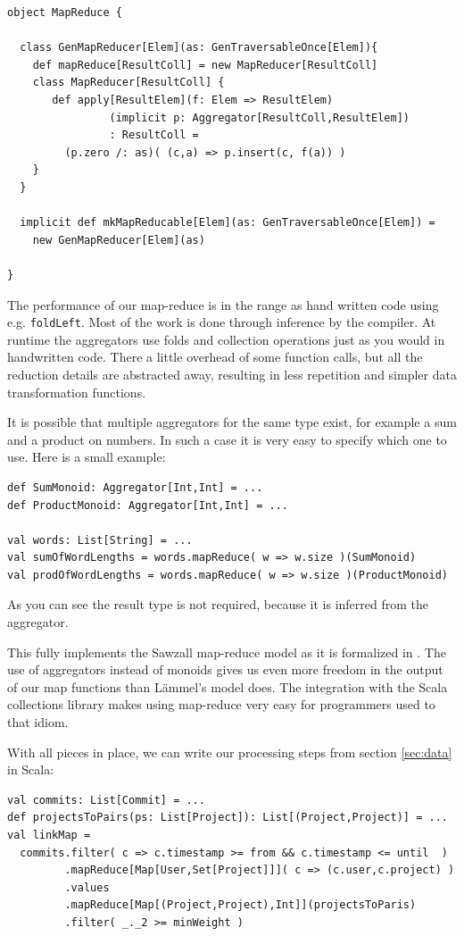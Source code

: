 \documentclass[10pt,a4paper]{article}
\begin{document}
\begin{lstlisting}[float,frame=tb,caption=MapReduce for Scala collections,label=lst:map-reduce]
object MapReduce {

  class GenMapReducer[Elem](as: GenTraversableOnce[Elem]){
    def mapReduce[ResultColl] = new MapReducer[ResultColl]
    class MapReducer[ResultColl] {
       def apply[ResultElem](f: Elem => ResultElem)
                (implicit p: Aggregator[ResultColl,ResultElem])
                : ResultColl =
  	     (p.zero /: as)( (c,a) => p.insert(c, f(a)) )
    }
  }

  implicit def mkMapReducable[Elem](as: GenTraversableOnce[Elem]) =
    new GenMapReducer[Elem](as)

}
\end{lstlisting}

The performance of our map-reduce is in the range as hand written code using e.g. \lstinline|foldLeft|. Most of the work is done through inference by the compiler. At runtime the aggregators use folds and collection operations just as you would in handwritten code. There a little overhead of some function calls, but all the reduction details are abstracted away, resulting in less repetition and simpler data transformation functions.

It is possible that multiple aggregators for the same type exist, for example a sum and a product on numbers. In such a case it is very easy to specify which one to use. Here is a small example:
\begin{lstlisting}
def SumMonoid: Aggregator[Int,Int] = ...
def ProductMonoid: Aggregator[Int,Int] = ...

val words: List[String] = ...
val sumOfWordLengths = words.mapReduce( w => w.size )(SumMonoid)
val prodOfWordLengths = words.mapReduce( w => w.size )(ProductMonoid)
\end{lstlisting}
As you can see the result type is not required, because it is inferred from the aggregator.

This fully implements the Sawzall map-reduce model as it is formalized in \cite{lammel2008google}. The use of aggregators instead of monoids gives us even more freedom in the output of our map functions than L\"ammel's model does. The integration with the Scala collections library makes using map-reduce very easy for programmers used to that idiom.

With all pieces in place, we can write our processing steps from section \ref{sec:data} in Scala:
\begin{lstlisting}
val commits: List[Commit] = ...
def projectsToPairs(ps: List[Project]): List[(Project,Project)] = ...
val linkMap = 
  commits.filter( c => c.timestamp >= from && c.timestamp <= until  )
         .mapReduce[Map[User,Set[Project]]]( c => (c.user,c.project) )
         .values
         .mapReduce[Map[(Project,Project),Int]](projectsToParis)
         .filter( _._2 >= minWeight )
\end{lstlisting}
\end{document}
